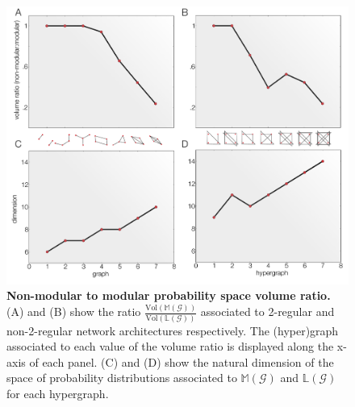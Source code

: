 
\begin{figure}[!ht]
\centering
\noindent\includegraphics[width=0.9\columnwidth]{fig/figure_graphs_dims_nolines.pdf}
\caption{{\bf Non-modular to modular probability space volume ratio.} (A) and (B) show the ratio $\frac{\text{Vol}(\mathbb{M}(\mathcal{G}))}{\text{Vol}(\mathbb{L}(\mathcal{G}))}$ associated to 2-regular and non-2-regular network architectures respectively. The (hyper)graph associated to each value of the volume ratio is displayed along the x-axis of each panel. (C) and (D) show the natural dimension of the space of probability distributions associated to $\mathbb{M}(\mathcal{G})$ and $\mathbb{L}(\mathcal{G})$ for each hypergraph.}
\label{fig:ncycvolrat}
\end{figure}

